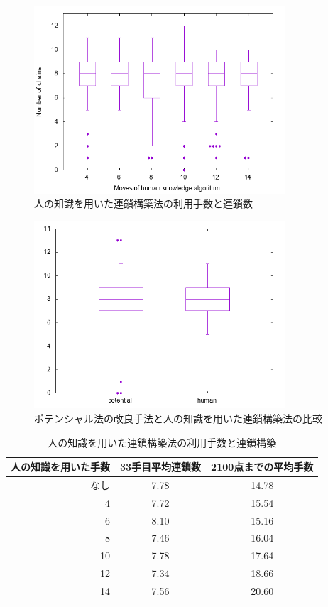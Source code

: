 \documentclass[12pt]{jreport}
\begin{document}
\begin{figure}[tbp]
  \begin{center}
  \includegraphics[height=7cm]{graph/HumanKnowledge/human_chain.png}
  \caption{人の知識を用いた連鎖構築法の利用手数と連鎖数} \label{fig:human_chain}
\end{center}
\end{figure}


\begin{figure}[tbp]
  \begin{center}
  \includegraphics[height=7cm]{graph/HumanKnowledge/chain_poten_human.png}
  \caption{ポテンシャル法の改良手法と人の知識を用いた連鎖構築法の比較} \label{fig:chain_poten_human}
\end{center}
\end{figure}


\begin{table}[tbp]
\begin{center}
\caption{人の知識を用いた連鎖構築法の利用手数と連鎖構築} \label{tab:human}
  \begin{tabular}{|r|c|c|} \hline
人の知識を用いた手数 & 33手目平均連鎖数 & 2100点までの平均手数\\ \hline
なし& 7.78 & 14.78\\ \hline
 4 & 7.72 & 15.54\\ \hline
 6 & 8.10 & 15.16\\ \hline
 8 & 7.46 & 16.04\\ \hline
10 & 7.78 & 17.64\\ \hline
12 & 7.34 & 18.66\\ \hline
14 & 7.56 & 20.60\\ \hline
\end{tabular}
\end{center}
\end{table}
\end{document}
